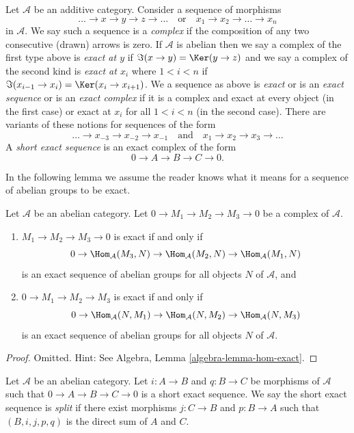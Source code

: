 \begin{definition}
\label{definition-exact}
Let $\mathcal{A}$ be an additive category. Consider a sequence of morphisms
$$
\ldots \to x \to y \to z \to \ldots
\quad\text{or}\quad
x_1 \to x_2 \to \ldots \to x_n
$$
in $\mathcal{A}$. We say such a sequence is a {\it complex} if the
composition of any two consecutive (drawn) arrows is zero.
If $\mathcal{A}$ is abelian then we say a complex of the first
type above is {\it exact at $y$} if $\Im(x \to y) = \Ker(y \to z)$
and we say a complex of the second kind is {\it exact at $x_i$}
where $1 < i < n$ if
$\Im(x_{i - 1} \to x_i) = \Ker(x_i \to x_{i + 1})$. We a
sequence as above is {\it exact} or is an {\it exact sequence} or is an
{\it exact complex} if it is a complex and exact at every object (in
the first case) or exact at $x_i$ for all $1 < i < n$ (in the second case).
There are variants of these notions for sequences of the form
$$
\ldots \to x_{-3} \to x_{-2} \to x_{-1}
\quad\text{and}\quad
x_1 \to x_2 \to x_3 \to \ldots
$$
A {\it short exact sequence} is an exact complex of the form
$$
0 \to A  \to B \to C \to 0.
$$
\end{definition}

\noindent
In the following lemma we assume the reader knows what it means
for a sequence of abelian groups to be exact.

\begin{lemma}
\label{lemma-check-exactness}
Let $\mathcal{A}$ be an abelian category.
Let $0 \to M_1 \to M_2 \to M_3 \to 0$ be a complex of $\mathcal{A}$.
\begin{enumerate}
\item $M_1 \to M_2 \to M_3 \to 0$ is exact if and only if
$$
0 \to \Hom_\mathcal{A}(M_3, N) \to
\Hom_\mathcal{A}(M_2, N) \to \Hom_\mathcal{A}(M_1, N)
$$
is an exact sequence of abelian groups for all objects $N$ of
$\mathcal{A}$, and
\item $0 \to M_1 \to M_2 \to M_3$ is exact if and only if
$$
0 \to \Hom_\mathcal{A}(N, M_1) \to \Hom_\mathcal{A}(N, M_2) \to
\Hom_\mathcal{A}(N, M_3)
$$
is an exact sequence of abelian groups for all objects $N$ of $\mathcal{A}$.
\end{enumerate}
\end{lemma}

\begin{proof}
Omitted. Hint: See
Algebra, Lemma \ref{algebra-lemma-hom-exact}.
\end{proof}

\begin{definition}
\label{definition-ses-split}
Let $\mathcal{A}$ be an abelian category.
Let $i : A \to B$ and $q : B \to C$ be morphisms
of $\mathcal{A}$ such that
$0 \to A \to B \to C \to 0$ is a short
exact sequence. We say the short exact
sequence is {\it split} if there exist
morphisms $j : C \to B$ and $p : B \to A$ such
that $(B, i, j, p, q)$ is the direct sum of $A$ and $C$.
\end{definition}

